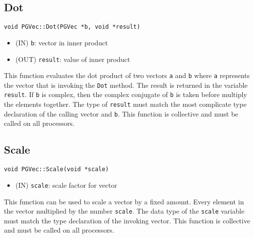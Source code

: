 \documentclass[12pt]{article}
\begin{document}
\subsection{Dot}
\begin{verbatim}
void PGVec::Dot(PGVec *b, void *result)
\end{verbatim}
\begin{itemize}
\item (IN) \texttt{b}: vector in inner product
\item (OUT) \texttt{result}: value of inner product
\end{itemize}
This function evaluates the dot product of two vectors \texttt{a} and
\texttt{b} where \texttt{a} represents the vector that is invoking the
\texttt{Dot} method. The result is returned in the variable \texttt{result}. If
\texttt{b} is complex, then the complex conjugate of \texttt{b} is taken before
multiply the elements together. The type of \texttt{result} must match the most
complicate type declaration of the calling vector and \texttt{b}. This function
is collective and must be called on all processors.
\subsection{Scale}
\begin{verbatim}
void PGVec::Scale(void *scale)
\end{verbatim}
\begin{itemize}
\item (IN) \texttt{scale}: scale factor for vector
\end{itemize}
This function can be used to scale a vector by a fixed amount. Every element in
the vector multiplied by the number \texttt{scale}. The data type of the
\texttt{scale} variable must match the type declaration of the invoking vector.
This function is collective and must be called on all processors.
\end{document}
